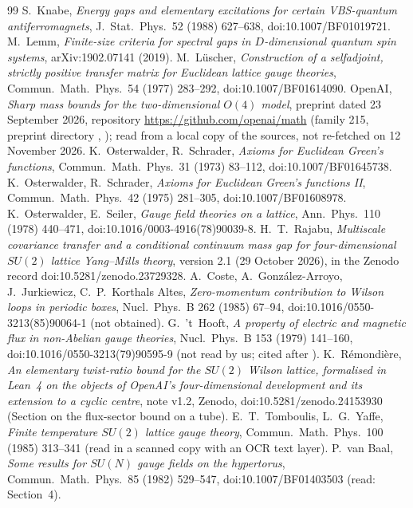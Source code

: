 \documentclass[11pt,a4paper]{article}
\theoremstyle{plain}
\theoremstyle{definition}
\theoremstyle{remark}
\numberwithin{equation}{section}
\begin{document}
{\begin{thebibliography}{99}
 S.~Knabe, \emph{Energy gaps and elementary excitations for certain VBS-quantum antiferromagnets}, J.\ Stat.\ Phys.\ 52
(1988) 627--638, doi:10.1007/BF01019721.
 M.~Lemm, \emph{Finite-size criteria for spectral gaps in $D$-dimensional quantum spin systems}, arXiv:1902.07141 (2019).
 M.~L\"uscher, \emph{Construction of a selfadjoint, strictly positive transfer matrix for Euclidean lattice gauge
theories}, Commun.\ Math.\ Phys.\ 54 (1977) 283--292, doi:10.1007/BF01614090.
 OpenAI, \emph{Sharp mass bounds for the two-dimensional $O(4)$ model}, preprint dated 23 September 2026, repository
\url{https://github.com/openai/math} (family 215, preprint directory ,
); read from a local copy of the sources, not re-fetched on 12 November 2026.
 K.~Osterwalder, R.~Schrader, \emph{Axioms for Euclidean Green's functions}, Commun.\ Math.\ Phys.\ 31 (1973) 83--112,
doi:10.1007/BF01645738.
 K.~Osterwalder, R.~Schrader, \emph{Axioms for Euclidean Green's functions II}, Commun.\ Math.\ Phys.\ 42 (1975)
281--305, doi:10.1007/BF01608978.
 K.~Osterwalder, E.~Seiler, \emph{Gauge field theories on a lattice}, Ann.\ Phys.\ 110 (1978) 440--471,
doi:10.1016/0003-4916(78)90039-8.
 H.~T.~Rajabu, \emph{Multiscale covariance transfer and a conditional continuum mass gap for four-dimensional $SU(2)$
lattice Yang--Mills theory}, version 2.1 (29 October 2026), in the Zenodo record doi:10.5281/zenodo.23729328.
 A.~Coste, A.~Gonz\'alez-Arroyo, J.~Jurkiewicz, C.~P.~Korthals Altes, \emph{Zero-momentum contribution to Wilson loops in periodic boxes}, Nucl.\ Phys.\ B 262 (1985) 67--94, doi:10.1016/0550-3213(85)90064-1 (not obtained).
 G.~'t~Hooft, \emph{A property of electric and magnetic flux in non-Abelian gauge theories}, Nucl.\ Phys.\ B 153 (1979) 141--160, doi:10.1016/0550-3213(79)90595-9 (not read by us; cited after \cite{TY85}).
 K.~R\'emondi\`ere, \emph{An elementary twist-ratio bound for the $SU(2)$ Wilson lattice, formalised in Lean~4 on the objects of OpenAI's four-dimensional development and its extension to a cyclic centre}, note v1.2, Zenodo, doi:10.5281/zenodo.24153930 (Section on the flux-sector bound on a tube).
 E.~T.~Tomboulis, L.~G.~Yaffe, \emph{Finite temperature $SU(2)$ lattice gauge theory}, Commun.\ Math.\ Phys.\ 100 (1985) 313--341 (read in a scanned copy with an OCR text layer).
 P.~van Baal, \emph{Some results for $SU(N)$ gauge fields on the hypertorus}, Commun.\ Math.\ Phys.\ 85 (1982) 529--547, doi:10.1007/BF01403503 (read: Section~4).

\end{thebibliography}}
\end{document}
